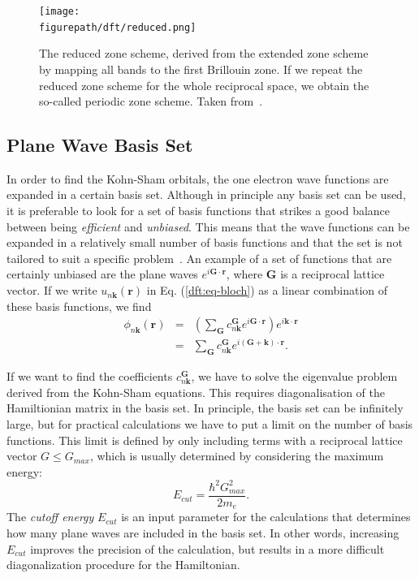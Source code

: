 \begin{refsection}
\begin{figure}[ht] 
\captionsetup{width=0.8\textwidth} 
\centering 
\texttt{[image: \\figurepath/dft/reduced.png]} 
\caption{\label{dft:fig-reduced}The reduced zone scheme, derived from the extended 
zone scheme by mapping all bands to the first Brillouin zone. If we repeat the 
reduced zone scheme for the whole reciprocal space, we obtain the so-called 
periodic zone scheme. Taken from~\cite{Kittel2005}.} 
\end{figure} 
 
\subsection{Plane Wave Basis Set} \label{dft:sec-planewave} 
 
In order to find the Kohn-Sham orbitals, the one electron wave functions are 
expanded in a certain basis set. Although in principle any basis set can be 
used, it is preferable to look for a set of basis functions that strikes a good balance between being  
\textit{efficient} and \textit{unbiased}. This means that the wave functions 
can be expanded in a relatively small number of basis functions and that the 
set is not tailored to suit a specific problem~\cite{Cottenier2013}. An 
example of a set of functions that are certainly unbiased are the plane waves $e^{i \mathbf{G}\cdot 
\mathbf{r}}$, where $\mathbf{G}$ is a reciprocal lattice vector. If we write 
$u_{n\mathbf{k}}(\mathbf{r})$ in Eq. (\ref{dft:eq-bloch}) as a linear combination of 
these basis functions, we find 
\begin{eqnarray} 
\phi_{n\mathbf{k}}(\mathbf{r}) &=& \left( \sum_{\mathbf{G}} 
c_{n\mathbf{k}}^{\mathbf{G}}e^{i\mathbf{G}\cdot \mathbf{r}} \right) 
e^{i\mathbf{k}\cdot \mathbf{r}} 
\\ \label{dft:eq-planewaves} &=& \sum_{\mathbf{G}} 
c_{n\mathbf{k}}^{\mathbf{G}}e^{i(\mathbf{G}+\mathbf{k})\cdot \mathbf{r}}. 
\end{eqnarray} 
 
If we want to find the coefficients $c_{n\mathbf{k}}^{\mathbf{G}}$, we have to 
solve the eigenvalue problem derived from the Kohn-Sham equations. This 
requires diagonalisation of the Hamiltionian matrix in the basis set. In 
principle, the basis set can be infinitely large, but for practical 
calculations we have to put a limit on the number of basis functions. This 
limit is defined by only including terms with a reciprocal lattice vector $G 
\leq G_{max}$, which is usually determined by considering the maximum energy: 
\begin{equation} \label{dft:eq-energy_cutoff}
E_{cut} = \frac{\hbar^2 G_{max}^2}{2m_e}. 
\end{equation} 
The \textit{cutoff energy} $E_{cut}$ is an input parameter for the 
calculations that determines how many plane waves are included in the basis 
set. In other words, increasing $E_{cut}$ improves the precision of the 
calculation, but results in a more difficult diagonalization procedure for the 
Hamiltonian.  
 

\end{refsection}
